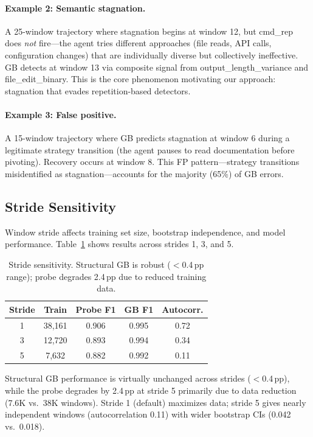 \documentclass[11pt,a4paper]{article}
\begin{document}
\paragraph{Example 2: Semantic stagnation.}
A 25-window trajectory where stagnation begins at window 12, but cmd\_rep does \emph{not} fire---the agent tries different approaches (file reads, API calls, configuration changes) that are individually diverse but collectively ineffective.
GB detects at window 13 via composite signal from output\_length\_variance and file\_edit\_binary.
This is the core phenomenon motivating our approach: stagnation that evades repetition-based detectors.

\paragraph{Example 3: False positive.}
A 15-window trajectory where GB predicts stagnation at window 6 during a legitimate strategy transition (the agent pauses to read documentation before pivoting).
Recovery occurs at window 8.
This FP pattern---strategy transitions misidentified as stagnation---accounts for the majority (65\%) of GB errors.

\subsection{Stride Sensitivity}
\label{sec:stride}

Window stride affects training set size, bootstrap independence, and model performance.
Table~\ref{tab:stride} shows results across strides 1, 3, and 5.

\begin{table}[t]
\centering
\small
\begin{tabular}{ccccc}
\toprule
\textbf{Stride} & \textbf{Train} & \textbf{Probe F1} & \textbf{GB F1} & \textbf{Autocorr.} \\
\midrule
1 & 38{,}161 & 0.906 & 0.995 & 0.72 \\
3 & 12{,}720 & 0.893 & 0.994 & 0.34 \\
5 & 7{,}632 & 0.882 & 0.992 & 0.11 \\
\bottomrule
\end{tabular}
\caption{Stride sensitivity. Structural GB is robust ($<$0.4\,pp range); probe degrades 2.4\,pp due to reduced training data.}
\label{tab:stride}
\end{table}

Structural GB performance is virtually unchanged across strides ($<$0.4\,pp), while the probe degrades by 2.4\,pp at stride 5 primarily due to data reduction (7.6K vs.\ 38K windows).
Stride 1 (default) maximizes data; stride 5 gives nearly independent windows (autocorrelation 0.11) with wider bootstrap CIs (0.042 vs.\ 0.018).
\end{document}
